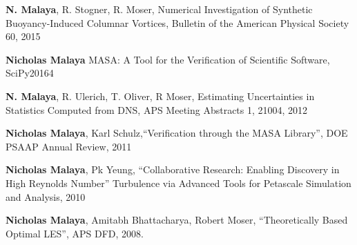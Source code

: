 \textbf{N. Malaya}, R. Stogner, R. Moser,
Numerical Investigation of Synthetic Buoyancy-Induced Columnar Vortices,
Bulletin of the American Physical Society 60, 2015

\textbf{Nicholas Malaya}
MASA: A Tool for the Verification of Scientific Software, SciPy20164
\blankline

\textbf{N. Malaya}, R. Ulerich, T. Oliver, R Moser, Estimating Uncertainties in
Statistics Computed from DNS, APS Meeting Abstracts 1, 21004, 2012 

\blankline

\textbf{Nicholas Malaya}, Karl Schulz,``Verification through the MASA Library'', DOE
PSAAP Annual Review, 2011

\blankline

\textbf{Nicholas Malaya},  Pk Yeung, ``Collaborative Research: Enabling Discovery in High Reynolds Number''
Turbulence via Advanced Tools for Petascale Simulation and Analysis, 2010

\blankline

\textbf{Nicholas Malaya}, Amitabh Bhattacharya, Robert Moser,
``Theoretically Based Optimal LES'', APS DFD, 2008.
